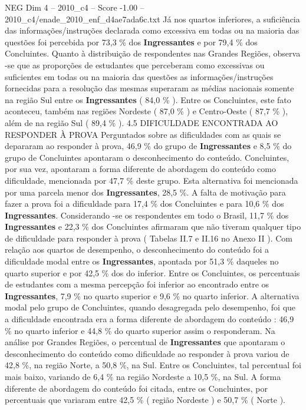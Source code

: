\begin{textsample}{NEG Dim 4 – 2010\_c4 – Score -1.00 – 2010\_c4/enade\_2010\_enf\_d4ae7ada6c.txt}
Já nos quartos inferiores, a suficiência das informações/instruções declarada como excessiva em todas ou na maioria das questões foi percebida por 73,3 \% dos \textbf{Ingressantes} e por 79,4 \% dos Concluintes.
Quanto à distribuição de respondentes nas Grandes Regiões, observa -se que as proporções de estudantes que perceberam como excessivas ou suficientes em todas ou na maioria das questões as informações/instruções fornecidas para a resolução das mesmas superaram as médias nacionais somente na região Sul entre os \textbf{Ingressantes} ( 84,0 \% ).
Entre os Concluintes, este fato aconteceu, também nas regiões Nordeste ( 87,0 \% ) e Centro-Oeste ( 87,7 \% ), além de na região Sul ( 89,4 \% ). 4.5 DIFICULDADE ENCONTRADA AO RESPONDER À PROVA Perguntados sobre as dificuldades com as quais se depararam ao responder à prova, 46,9 \% do grupo de \textbf{Ingressantes} e 8,5 \% do grupo de Concluintes apontaram o desconhecimento do conteúdo.
Concluintes, por sua vez, apontaram a forma diferente de abordagem do conteúdo como dificuldade, mencionada por 47,7 \% deste grupo.
Esta alternativa foi mencionada por uma parcela menor dos \textbf{Ingressantes}, 28,5 \%.
A falta de motivação para fazer a prova foi a dificuldade para 17,4 \% dos Concluintes e para 10,6 \% dos \textbf{Ingressantes}.
Considerando -se os respondentes em todo o Brasil, 11,7 \% dos \textbf{Ingressantes} e 22,3 \% dos Concluintes afirmaram que não tiveram qualquer tipo de dificuldade para responder à prova ( Tabelas II.7 e II.16 no Anexo II ).
Com relação aos quartos de desempenho, o desconhecimento do conteúdo foi a dificuldade modal entre os \textbf{Ingressantes}, apontada por 51,3 \% daqueles no quarto superior e por 42,5 \% dos do inferior.
Entre os Concluintes, os percentuais de estudantes com a mesma percepção foi inferior ao encontrado entre os \textbf{Ingressantes}, 7,9 \% no quarto superior e 9,6 \% no quarto inferior.
A alternativa modal pelo grupo de Concluintes, quando desagregada pelo desempenho, foi que a dificuldade encontrada era a forma diferente de abordagem do conteúdo : 46,9 \% no quarto inferior e 44,8 \% do quarto superior assim o responderam.
Na análise por Grandes Regiões, o percentual de \textbf{Ingressantes} que apontaram o desconhecimento do conteúdo como dificuldade ao responder à prova variou de 42,8 \%, na região Norte, a 50,8 \%, na Sul.
Entre os Concluintes, tal percentual foi mais baixo, variando de 6,4 \% na região Nordeste a 10,5 \%, na Sul.
A forma diferente de abordagem do conteúdo foi citada, entre os Concluintes, por percentuais que variaram entre 42,5 \% ( região Nordeste ) e 50,7 \% ( Norte ).

\end{textsample}

